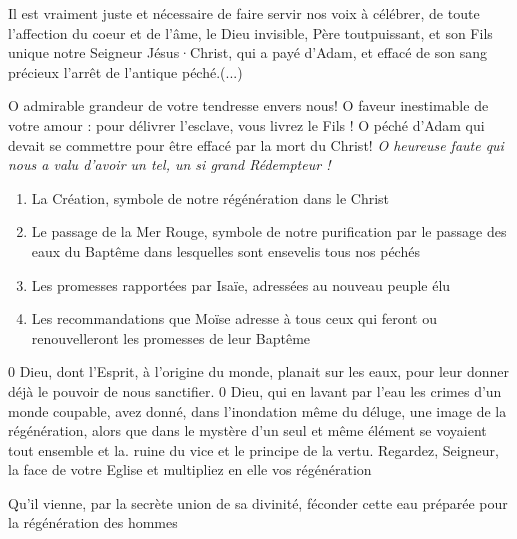\documentclass[%
fontsize=10%
,a5paper%
,DIV=15%
]{scrartcl}
\begin{document}

Il est vraiment juste et nécessaire
de faire servir nos voix à célébrer,
de toute l'affection du coeur et de
l'âme, le Dieu invisible, Père toutpuissant,
et son Fils unique notre Seigneur Jésus·Christ, qui a payé d'Adam, et effacé de son sang précieux l'arrêt de l'antique péché.(...)

O admirable grandeur de votre tendresse envers nous! O faveur inestimable de votre
amour : pour délivrer l'esclave, vous livrez le Fils !
O péché d'Adam qui devait se commettre pour être effacé par la mort du Christ!
\emph{O heureuse faute qui nous a valu d'avoir un tel, un si grand Rédempteur !}



\begin{enumerate}
\item{La Création, symbole de notre régénération dans le Christ}
\item{Le passage de la Mer Rouge, symbole de notre purification par le passage des eaux du Baptême dans lesquelles sont ensevelis tous nos péchés}
\item{Les promesses rapportées par Isaïe, adressées au nouveau peuple élu}
\item{Les recommandations que Moïse adresse à tous ceux qui feront ou renouvelleront les promesses de leur Baptême}
\end{enumerate}




0 Dieu, dont l'Esprit, à l'origine du
monde, planait sur les eaux, pour
leur donner déjà le pouvoir de nous
sanctifier. 0 Dieu, qui en lavant
par l'eau les crimes d'un monde coupable, avez donné, dans l'inondation
même du déluge, une image de la
régénération, alors que dans le mystère d'un seul et même élément se voyaient tout ensemble et la. ruine
du vice et le principe de la vertu.
Regardez, Seigneur, la face de votre
Eglise et multipliez en elle vos régénération

Qu'il vienne, par la secrète union
de sa divinité, féconder cette
eau préparée pour la régénération des hommes
\end{document}
